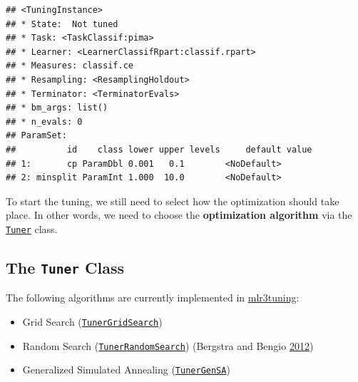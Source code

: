 \documentclass[]{scrbook}
\newenvironment{Shaded}{\begin{snugshade}}{\end{snugshade}}
\newcommand{\DataTypeTok}[1]{\textcolor[rgb]{0.13,0.29,0.53}{#1}}
\newcommand{\DecValTok}[1]{\textcolor[rgb]{0.00,0.00,0.81}{#1}}
\newcommand{\KeywordTok}[1]{\textcolor[rgb]{0.13,0.29,0.53}{\textbf{#1}}}
\newcommand{\NormalTok}[1]{#1}
\newcommand{\OperatorTok}[1]{\textcolor[rgb]{0.81,0.36,0.00}{\textbf{#1}}}
\newcommand{\StringTok}[1]{\textcolor[rgb]{0.31,0.60,0.02}{#1}}
\providecommand{\tightlist}{%
  \setlength{\itemsep}{0pt}\setlength{\parskip}{0pt}}
\renewenvironment{Shaded} {\begin{snugshade}\small} {\end{snugshade}}
\begin{document}
\begin{Shaded}
\end{Shaded}

\begin{verbatim}
## <TuningInstance>
## * State:  Not tuned
## * Task: <TaskClassif:pima>
## * Learner: <LearnerClassifRpart:classif.rpart>
## * Measures: classif.ce
## * Resampling: <ResamplingHoldout>
## * Terminator: <TerminatorEvals>
## * bm_args: list()
## * n_evals: 0
## ParamSet: 
##          id    class lower upper levels     default value
## 1:       cp ParamDbl 0.001   0.1        <NoDefault>      
## 2: minsplit ParamInt 1.000  10.0        <NoDefault>
\end{verbatim}

To start the tuning, we still need to select how the optimization should take place.
In other words, we need to choose the \textbf{optimization algorithm} via the \href{https://mlr3tuning.mlr-org.com/reference/Tuner.html}{\texttt{Tuner}} class.

\hypertarget{the-tuner-class}{%
\subsection{\texorpdfstring{The \texttt{Tuner} Class}{The Tuner Class}}\label{the-tuner-class}}

The following algorithms are currently implemented in \href{https://mlr3tuning.mlr-org.com}{mlr3tuning}:

\begin{itemize}
\tightlist
\item
  Grid Search (\href{https://mlr3tuning.mlr-org.com/reference/mlr_tuners_grid_search.html}{\texttt{TunerGridSearch}})
\item
  Random Search (\href{https://mlr3tuning.mlr-org.com/reference/mlr_tuners_random_search.html}{\texttt{TunerRandomSearch}}) (Bergstra and Bengio \protect\hyperlink{ref-bergstra2012}{2012})
\item
  Generalized Simulated Annealing (\href{https://mlr3tuning.mlr-org.com/reference/mlr_tuners_gensa.html}{\texttt{TunerGenSA}})
\end{itemize}
\end{document}
